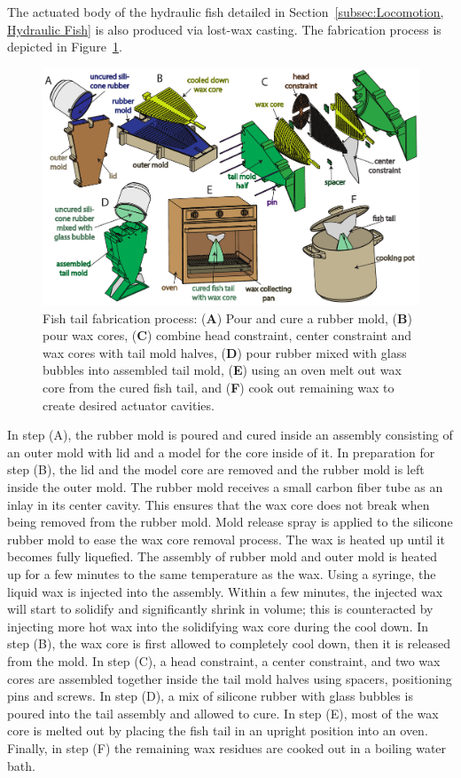 The actuated body of the hydraulic fish detailed in Section~\ref{subsec:Locomotion, Hydraulic Fish} is also produced via lost-wax casting. The fabrication process is depicted in Figure~\ref{fig:fabrication}.
\begin{figure}[htb]
        \centering
         \includegraphics[width=0.99\columnwidth]{figures/fabrication/fab_hydraulic_fish_tail.pdf}
         \caption[Fish tail fabrication process]{Fish tail fabrication process: (\textbf{A}) Pour and cure a rubber mold, (\textbf{B}) pour wax cores, (\textbf{C}) combine head constraint, center constraint and wax cores with tail mold halves, (\textbf{D}) pour rubber mixed with glass bubbles into assembled tail mold, (\textbf{E}) using an oven melt out wax core from the cured fish tail, and (\textbf{F}) cook out remaining wax to create desired actuator cavities.}\label{fig:fabrication}
\end{figure}
In step (A), the rubber mold is poured and cured inside an assembly consisting of an outer mold with lid and a model for the core inside of it.
In preparation for step (B), the lid and the model core are removed and the rubber mold is left inside the outer mold.
The rubber mold receives a small carbon fiber tube as an inlay in its center cavity.
This ensures that the wax core does not break when being removed from the rubber mold.
Mold release spray is applied to the silicone rubber mold to ease the wax core removal process.
The wax is heated up until it becomes fully liquefied.
The assembly of rubber mold and outer mold is heated up for a few minutes to the same temperature as the wax.
Using a syringe, the liquid wax is injected into the assembly.
Within a few minutes, the injected wax will start to solidify and significantly shrink in volume; this is counteracted by injecting more hot wax into the solidifying wax core during the cool down.
In step (B), the wax core is first allowed to completely cool down, then it is released from the mold.
In step (C), a head constraint, a center constraint, and two wax cores are assembled together inside the tail mold halves using spacers, positioning pins and screws.
In step (D), a mix of silicone rubber with glass bubbles is poured into the tail assembly and allowed to cure.
In step (E), most of the wax core is melted out by placing the fish tail in an upright position into an oven. Finally, in step (F) the remaining wax residues are cooked out in a boiling water bath.

